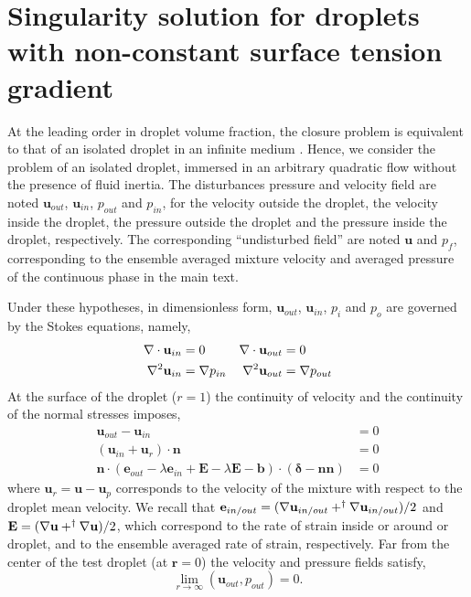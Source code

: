 \section{Singularity solution for droplets with non-constant surface tension gradient}
\label{ap:singularity_solution}
At the leading order in droplet volume fraction, the closure problem is equivalent to that of an isolated droplet in an infinite medium \citet{hinch1977averaged}. 
Hence, we consider the problem of an isolated droplet, immersed in an arbitrary quadratic flow without the presence of fluid inertia. 
The disturbances pressure and velocity field are noted $\textbf{u}_{out}$, $\textbf{u}_{in}$, $p_{out}$ and $p_{in}$, for the velocity outside the droplet, the velocity inside the droplet, the pressure outside the droplet and the pressure inside the droplet, respectively. 
The corresponding ``undisturbed field'' are noted $\textbf{u}$ and $p_f$, corresponding to the ensemble averaged mixture velocity and averaged pressure of the continuous phase in the main text. 


Under these hypotheses, in dimensionless form, $\textbf{u}_{out}$, $\textbf{u}_{in}$, $p_i$ and $p_o$ are governed by the Stokes equations, namely, 
\begin{align}
    \mathbf{\nabla}\cdot \textbf{u}_{in} &= 0 
    & \mathbf{\nabla}\cdot \textbf{u}_{out} &= 0 \\
     \mathbf{\nabla}^2 \textbf{u}_{in}  &= \mathbf{\nabla} p_{in} 
    & \mathbf{\nabla}^2 \textbf{u}_{out} &= \mathbf{\nabla} p_{out} 
\end{align}
At the surface of the droplet ($r=1$) the continuity of velocity and the continuity of the normal stresses imposes, 
\begin{align}
    \textbf{u}_{out} - \textbf{u}_{in} &= 0\\
    (\textbf{u}_{in}  + \textbf{u}_r)\cdot \textbf{n}
    &= 0\\
    \mathbf{n}\cdot (\textbf{e}_{out} - \lambda \textbf{e}_{in}+\textbf{E} -\lambda\textbf{E} - \textbf{b})\cdot (\bm\delta - \textbf{nn})
    &= 0 %
\end{align}
where $\textbf{u}_r = \textbf{u} - \textbf{u}_p$ corresponds to the velocity of the mixture with respect to the droplet mean velocity. 
We recall that $\textbf{e}_{in/out} = (\mathbf{\nabla} \textbf{u}_{in/out} + ^\dagger \mathbf{\nabla} \textbf{u}_{in/out})/2 $ and $\textbf{E} = (\mathbf{\nabla} \textbf{u} + ^\dagger \mathbf{\nabla} \textbf{u})/2$, which correspond to the rate of strain inside or around or droplet, and to the ensemble averaged rate of strain, respectively. 
Far from the center of the test droplet (at $\textbf{r}=0$) the velocity and pressure fields satisfy, 
\begin{equation}
    \lim_{r\to \infty}(\textbf{u}_{out},p_{out}) = 0. 
\end{equation}

